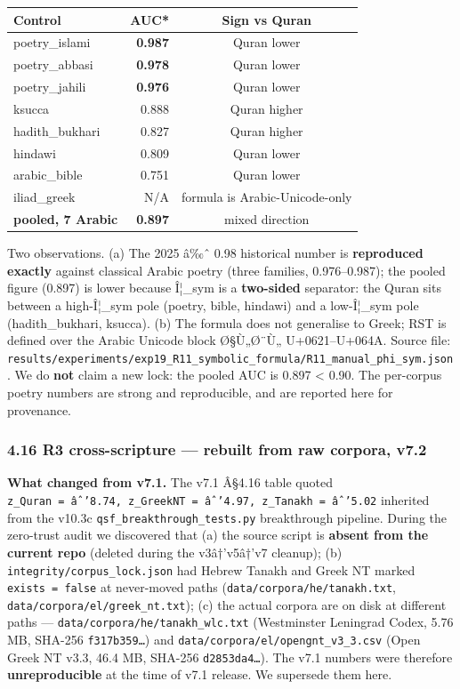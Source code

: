 \documentclass[
]{article}
\newcounter{none} %
\begin{document}
{\def\LTcaptype{none} %
\begin{longtable}[]{@{}lrc@{}}
\toprule\noalign{}
Control & AUC* & Sign vs Quran \\
\midrule\noalign{}
\endhead
\bottomrule\noalign{}
\endlastfoot
poetry\_islami & \textbf{0.987} & Quran lower \\
poetry\_abbasi & \textbf{0.978} & Quran lower \\
poetry\_jahili & \textbf{0.976} & Quran lower \\
ksucca & 0.888 & Quran higher \\
hadith\_bukhari & 0.827 & Quran higher \\
hindawi & 0.809 & Quran lower \\
arabic\_bible & 0.751 & Quran lower \\
iliad\_greek & N/A & formula is Arabic-Unicode-only \\
\textbf{pooled, 7 Arabic} & \textbf{0.897} & mixed direction \\
\end{longtable}
}

Two observations. (a) The 2025 â‰ˆ 0.98 historical number is
\textbf{reproduced exactly} against classical Arabic poetry (three
families, 0.976--0.987); the pooled figure (0.897) is lower because
Î¦\_sym is a \textbf{two-sided} separator: the Quran sits between a
high-Î¦\_sym pole (poetry, bible, hindawi) and a low-Î¦\_sym pole
(hadith\_bukhari, ksucca). (b) The formula does not generalise to Greek;
RST is defined over the Arabic Unicode block Ø§Ù„Ø¨Ù„ U+0621--U+064A.
Source file:
\texttt{results/experiments/exp19\_R11\_symbolic\_formula/R11\_manual\_phi\_sym.json}.
We do \textbf{not} claim a new lock: the pooled AUC is 0.897 \textless{}
0.90. The per-corpus poetry numbers are strong and reproducible, and are
reported here for provenance.

\subsubsection{4.16 R3 cross-scripture --- rebuilt from raw corpora,
v7.2}\label{r3-cross-scripture-rebuilt-from-raw-corpora-v7.2}

\textbf{What changed from v7.1.} The v7.1 Â§4.16 table quoted
\texttt{z\_Quran\ =\ âˆ’8.74,\ z\_GreekNT\ =\ âˆ’4.97,\ z\_Tanakh\ =\ âˆ’5.02}
inherited from the v10.3c \texttt{qsf\_breakthrough\_tests.py}
breakthrough pipeline. During the zero-trust audit we discovered that
(a) the source script is \textbf{absent from the current repo} (deleted
during the v3â†'v5â†'v7 cleanup); (b)
\texttt{integrity/corpus\_lock.json} had Hebrew Tanakh and Greek NT
marked \texttt{exists\ =\ false} at never-moved paths
(\texttt{data/corpora/he/tanakh.txt},
\texttt{data/corpora/el/greek\_nt.txt}); (c) the actual corpora are on
disk at different paths --- \texttt{data/corpora/he/tanakh\_wlc.txt}
(Westminster Leningrad Codex, 5.76 MB, SHA-256 \texttt{f317b359…}) and
\texttt{data/corpora/el/opengnt\_v3\_3.csv} (Open Greek NT v3.3, 46.4
MB, SHA-256 \texttt{d2853da4…}). The v7.1 numbers were therefore
\textbf{unreproducible} at the time of v7.1 release. We supersede them
here.
\end{document}
